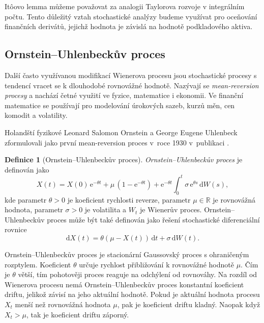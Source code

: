 \documentclass[a4paper,12pt]{report}
\theoremstyle{definition} \newtheorem{definice}[veta]{Definice}
\theoremstyle{remark}
\begin{document}
It\^oovo lemma můžeme považovat za analogii Taylorova rozvoje v integrálním počtu.
Tento důležitý vztah stochastické analýzy budeme využívat pro oceňování finančních derivátů, jejichž hodnota je závislá na hodnotě podkladového aktiva.


\subsection{Ornstein–Uhlenbeckův proces}\label{OU_kap}
Další často využívanou modifikací Wienerova procesu jsou stochastické procesy s tendencí vracet se k dlouhodobé rovnovážné hodnotě.
Nazývají se \textit{mean-reversion procesy} a nachází četné využití ve fyzice, matematice i ekonomii.
Ve finanční matematice se používají pro modelování úrokových sazeb, kurzů měn, cen komodit a volatility.

Holandští fyzikové Leonard Salomon Ornstein a George Eugene Uhlenbeck zformulovali jako první mean-reversion proces v~roce 1930 v~publikaci \cite{OrnsteinUhlenbeck1930}. %

\begin{definice}[Ornstein–Uhlenbeckův proces]
\textit{Ornstein–Uhlenbeckův proces} je definován jako
\begin{equation}\label{OUP}
X(t) = X(0)\,\mathrm{e}^{-\theta t} + \mu\,(1-\mathrm{e}^{-\theta t}) + \mathrm{e}^{-\theta t}\int_0^t \sigma\,\mathrm{e}^{\theta s}\,\mathrm{d}W(s),
\end{equation}
kde parametr $\theta>0$ je koeficient rychlosti reverze, parametr $\mu\in\mathbb{R}$ je rovnovážná hodnota, parametr $\sigma>0$ je volatilita a $W_t$ je Wienerův proces.
Ornstein–Uhlenbeckův proces může být také definován jako řešení stochastické diferenciální rovnice
\begin{equation}\label{SDE_OUP}
\mathrm{d}X(t) = \theta(\mu-X(t))\,\mathrm{d}t + \sigma\,\mathrm{d}W(t).
\end{equation}
\end{definice}

Ornstein–Uhlenbeckův proces je stacionární Gaussovský proces s ohraničeným rozptylem. 
Koeficient $\theta$ určuje rychlost přibližování k rovnovážné hodnotě $\mu$. %
Čím je $\theta$ větší, tím pohotověji proces reaguje na odchýlení od rovnováhy. 
Na rozdíl od Wienerova procesu nemá Ornstein–Uhlenbeckův proces konstantní koeficient driftu, jelikož závisí na jeho aktuální hodnotě.
Pokud je aktuální hodnota procesu $X_t$ menší než rovnovážná hodnota $\mu$, pak je koeficient driftu kladný.
Naopak když $X_t>\mu$, tak je koeficient driftu záporný.
\end{document}
